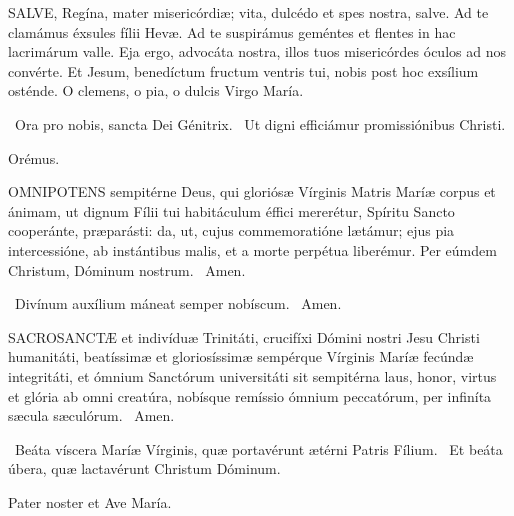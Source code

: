 
\lettrine[lines=2]{S}{ALVE}, Regína, mater misericórdiæ; vita, dulcédo et spes nostra, salve. Ad te clamámus éxsules fílii Hevæ. Ad te suspirámus geméntes et flentes in hac lacrimárum valle. Eja ergo, advocáta nostra, illos tuos misericórdes óculos ad nos convérte. Et Jesum, benedíctum fructum ventris tui, nobis post hoc exsílium osténde. O clemens, o pia, o dulcis Virgo María.

\V\ Ora pro nobis, sancta Dei Génitrix. \R\ Ut digni efficiámur promissiónibus Christi.

Orémus. 

\lettrine[lines=2]{O}{MNIPOTENS} sempitérne Deus, qui gloriósæ Vírginis Matris Maríæ corpus et ánimam, ut dignum Fílii tui habitáculum éffici mererétur, Spíritu Sancto cooperánte, præparásti: da, ut, cujus commemoratióne lætámur; ejus pia intercessióne, ab instántibus malis, et a morte perpétua liberémur. Per eúmdem Christum, Dóminum nostrum. \R\ Amen.


\V\ Divínum auxílium máneat semper nobíscum. \R\ Amen.




\lettrine[lines=2]{S}{ACROSANCTÆ} et indivíduæ Trinitáti, crucifíxi Dómini nostri Jesu Christi humanitáti, beatíssimæ et gloriosíssimæ sempérque Vírginis Maríæ fecúndæ integritáti, et ómnium Sanctórum universitáti sit sempitérna laus, honor, virtus et glória ab omni creatúra, nobísque remíssio ómnium peccatórum, per infiníta sæcula sæculórum. \R\ Amen.

\V\ Beáta víscera Maríæ Vírginis, quæ portavérunt ætérni Patris Fílium. \R\ Et beáta úbera, quæ lactavérunt Christum Dóminum.

 Pater noster et Ave María.

